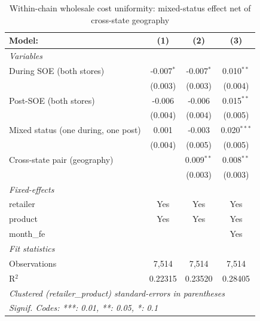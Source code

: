 
\begin{table}[htbp]
   \caption{\label{tab:uniformity_wholesale_crossstate} Within-chain wholesale cost uniformity: mixed-status effect net of cross-state geography}
   \centering
   \begin{tabular}{lccc}
      \tabularnewline \midrule \midrule
      Model:                              & (1)          & (2)          & (3)\\  
      \midrule
      \emph{Variables}\\
      During SOE (both stores)            & -0.007$^{*}$ & -0.007$^{*}$ & 0.010$^{**}$\\   
                                          & (0.003)      & (0.003)      & (0.004)\\   
      Post-SOE (both stores)              & -0.006       & -0.006       & 0.015$^{**}$\\   
                                          & (0.004)      & (0.004)      & (0.005)\\   
      Mixed status (one during, one post) & 0.001        & -0.003       & 0.020$^{***}$\\   
                                          & (0.004)      & (0.005)      & (0.005)\\   
      Cross-state pair (geography)        &              & 0.009$^{**}$ & 0.008$^{**}$\\   
                                          &              & (0.003)      & (0.003)\\   
      \midrule
      \emph{Fixed-effects}\\
      retailer                            & Yes          & Yes          & Yes\\  
      product                             & Yes          & Yes          & Yes\\  
      month\_fe                           &              &              & Yes\\  
      \midrule
      \emph{Fit statistics}\\
      Observations                        & 7,514        & 7,514        & 7,514\\  
      R$^2$                               & 0.22315      & 0.23520      & 0.28405\\  
      \midrule \midrule
      \multicolumn{4}{l}{\emph{Clustered (retailer\_product) standard-errors in parentheses}}\\
      \multicolumn{4}{l}{\emph{Signif. Codes: ***: 0.01, **: 0.05, *: 0.1}}\\
   \end{tabular}
   

\end{table}
